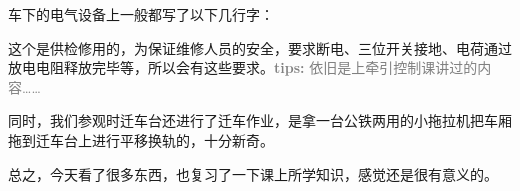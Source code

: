 \documentclass[12pt, oneside, a4paper]{ctexart}
\begin{document}
\newpage
\journalpage\par{}
车下的电气设备上一般都写了以下几行字：\par{}
\begin{center}
  \setlength{\fboxsep}{7pt}
\end{center}
这个是供检修用的，为保证维修人员的安全，要求断电、三位开关接地、电荷通过放电电阻释放完毕等，所以会有这些要求。\textcolor{gray}{{\bf{}tips: }依旧是上牵引控制课讲过的内容……}\par{}
同时，我们参观时迁车台还进行了迁车作业，是拿一台公铁两用的小拖拉机把车厢拖到迁车台上进行平移换轨的，十分新奇。\par{}
总之，今天看了很多东西，也复习了一下课上所学知识，感觉还是很有意义的。\par{}

\newpage
\journalpage
\vspace{-7.5mm}
\hypertarget{journal-day-0710}{}
\end{document}
